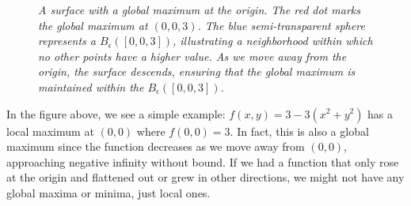 \begin{figure}[H]
\caption{\textit{A surface with a global maximum at the origin. The red dot marks the global maximum at $(0, 0, 3)$. The blue semi-transparent sphere represents a $B_\epsilon([0,0,3])$, illustrating a neighborhood within which no other points have a higher value. As we move away from the origin, the surface descends, ensuring that the global maximum is maintained within the $B_\epsilon([0,0,3])$.}}
\end{figure}





\noindent In the figure above, we see a simple example: \( f(x,y)=3 - 3(x^2+y^2) \) has a local maximum at \((0,0)\) where \( f(0,0)=3 \). In fact, this is also a global maximum since the function decreases as we move away from \((0,0)\), approaching negative infinity without bound. If we had a function that only rose at the origin and flattened out or grew in other directions, we might not have any global maxima or minima, just local ones. 



